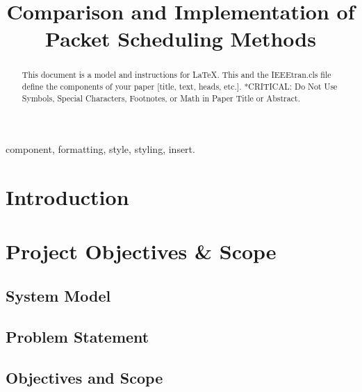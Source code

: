 \documentclass[conference]{IEEEtran}
\begin{document}
\title{Comparison and Implementation of Packet Scheduling Methods}

    \author{
    }

    \maketitle

    \begin{abstract}
        This document is a model and instructions for \LaTeX.
        This and the IEEEtran.cls file define the components of your paper [title, text, heads, etc.]. *CRITICAL: Do Not Use Symbols, Special Characters, Footnotes,
        or Math in Paper Title or Abstract.
    \end{abstract}

    \begin{IEEEkeywords}
        component, formatting, style, styling, insert.
    \end{IEEEkeywords}

    \section{Introduction}

    \section{Project Objectives \& Scope}

    \subsection{System Model}

    \subsection{Problem Statement}

    \subsection{Objectives and Scope}
\end{document}
